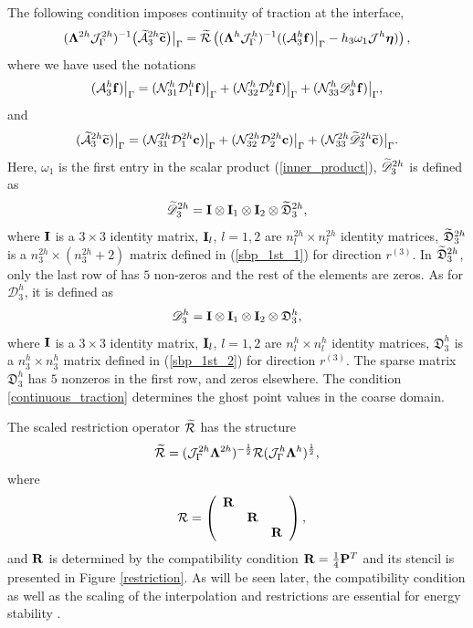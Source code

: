 The following condition imposes continuity of traction at the interface,
\begin{equation}\label{continuous_traction}
(\bm{\Lambda}^{2h}{\mathcal J}_{\Gamma}^{2h})^{-1}\big(\wt{\mathcal{A}}_3^{2h}\wt{\bf c}\big)\big|_\Gamma
= \wt{\mathcal{R}}\left((\bm{\Lambda}^{h}{\mathcal J}^h_{\Gamma})^{-1}((\mathcal{A}_3^h{\bf f})\big|_\Gamma-h_3\omega_1{\mathcal J}^h{\bm \eta})\right),
\end{equation}
where we have used the notations
\begin{equation}\label{hatAf}
(\mathcal{A}_3^h{\bf f})\big|_\Gamma = (\mathcal{N}_{31}^{h}\mathcal{D}^h_1{\bf f})\big|_\Gamma + (\mathcal{N}_{32}^h\mathcal{D}^h_2{\bf f})\big|_\Gamma + (\mathcal{N}_{33}^h\mathscr{D}_3^h{\bf f})\big|_\Gamma,
\end{equation}
and
\begin{equation}\label{hatAc}
(\wt{\mathcal{A}}_3^{2h}\wt{\bf c})\big|_\Gamma = (\mathcal{N}_{31}^{2h}\mathcal{D}^{2h}_1{\bf c})\big|_\Gamma + (\mathcal{N}_{32}^{2h}\mathcal{D}^{2h}_2{\bf c})\big|_\Gamma + (\mathcal{N}_{33}^{2h}\wt{\mathscr D}^{2h}_3\wt{\bf c})\big|_\Gamma.
\end{equation}
Here, $\omega_1$ is the first entry in the scalar product (\ref{inner_product}), $\widetilde{\mathscr{D}}_3^{2h}$ is defined as
\[\widetilde{\mathscr{D}}_3^{2h} = {\bf I}\otimes {\bf I}_1 \otimes {\bf I}_2 \otimes \widetilde{\mathfrak{D}}_3^{2h},\]
where ${\bf I}$ is a $3\times3$ identity matrix, ${\bf I}_l$, $l = 1,2$ are $n_l^{2h}\times n_l^{2h}$ identity matrices, $\widetilde{\mathfrak{D}}_3^{2h}$ is a $n_3^{2h}\times (n_3^{2h}+2)$ matrix defined in (\ref{sbp_1st_1}) for direction $r^{(3)}$. In $\widetilde{\mathfrak{D}}_3^{2h}$, only the last row of  has $5$ non-zeros and the rest of the elements are zeros. As for $\mathscr{D}_3^{h}$, it is defined as
\[\mathscr{D}_3^{h} = {\bf I}\otimes {\bf I}_1 \otimes {\bf I}_2 \otimes {\mathfrak{D}}_3^{h},\]
where ${\bf I}$ is a $3\times3$ identity matrix, ${\bf I}_l$, $l = 1,2$ are $n_l^{h}\times n_l^{h}$ identity matrices, $\mathfrak{D}_3^{h}$ is a $n_3^{h}\times n_3^{h}$ matrix defined in (\ref{sbp_1st_2}) for direction $r^{(3)}$. The sparse matrix $\mathfrak{D}_3^{h}$ has $5$ nonzeros in the first row, and zeros elsewhere. The condition \eqref{continuous_traction} determines the ghost point values in the coarse domain. 

The scaled restriction operator $\widetilde{\mathcal{R}} $ has the structure 
 \[\widetilde{\mathcal{R}} =  (\mathcal{J}^{2h}_\Gamma \bm{\Lambda}^{2h})^{-\frac{1}{2}}\mathcal{R}(\mathcal{J}^{h}_\Gamma \bm{\Lambda}^h)^{\frac{1}{2}},\]
 where
\begin{align*}
\ \ \mathcal{R} = \left(\begin{array}{ccc}
{\bf R}& ~  & ~ \\
~ & {\bf R} & ~ \\
~ &~  &{\bf R}\end{array}\right),
\end{align*}
and ${\bf R}$ is determined by the compatibility condition ${\bf R}=\frac{1}{4}{\bf P}^T$ and its stencil is presented in Figure \ref{restriction}. As will be seen later, the compatibility condition as well as the scaling of the interpolation and restrictions are essential for energy stability \cite{Lundquist2018}.

